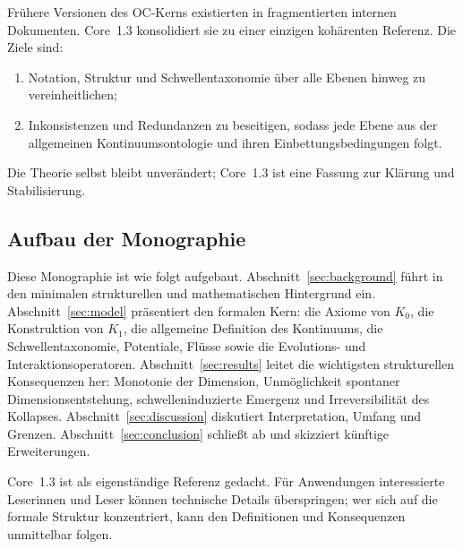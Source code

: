 Frühere Versionen des OC-Kerns existierten in fragmentierten internen Dokumenten. Core~1.3 konsolidiert sie zu einer einzigen kohärenten Referenz. Die Ziele sind:

\begin{enumerate}
    \item Notation, Struktur und Schwellentaxonomie über alle Ebenen hinweg zu vereinheitlichen;
    \item Inkonsistenzen und Redundanzen zu beseitigen, sodass jede Ebene aus der allgemeinen Kontinuumsontologie und ihren Einbettungsbedingungen folgt.
\end{enumerate}

Die Theorie selbst bleibt unverändert; Core~1.3 ist eine Fassung zur Klärung und Stabilisierung.

\subsection{Aufbau der Monographie}

Diese Monographie ist wie folgt aufgebaut.  
Abschnitt~\ref{sec:background} führt in den minimalen strukturellen und mathematischen Hintergrund ein.  
Abschnitt~\ref{sec:model} präsentiert den formalen Kern: die Axiome von \(K_0\), die Konstruktion von \(K_1\), die allgemeine Definition des Kontinuums, die Schwellentaxonomie, Potentiale, Flüsse sowie die Evolutions- und Interaktionsoperatoren.  
Abschnitt~\ref{sec:results} leitet die wichtigsten strukturellen Konsequenzen her: Monotonie der Dimension, Unmöglichkeit spontaner Dimensionsentstehung, schwelleninduzierte Emergenz und Irreversibilität des Kollapses.  
Abschnitt~\ref{sec:discussion} diskutiert Interpretation, Umfang und Grenzen.  
Abschnitt~\ref{sec:conclusion} schließt ab und skizziert künftige Erweiterungen.

Core~1.3 ist als eigenständige Referenz gedacht. Für Anwendungen interessierte Leserinnen und Leser können technische Details überspringen; wer sich auf die formale Struktur konzentriert, kann den Definitionen und Konsequenzen unmittelbar folgen.
